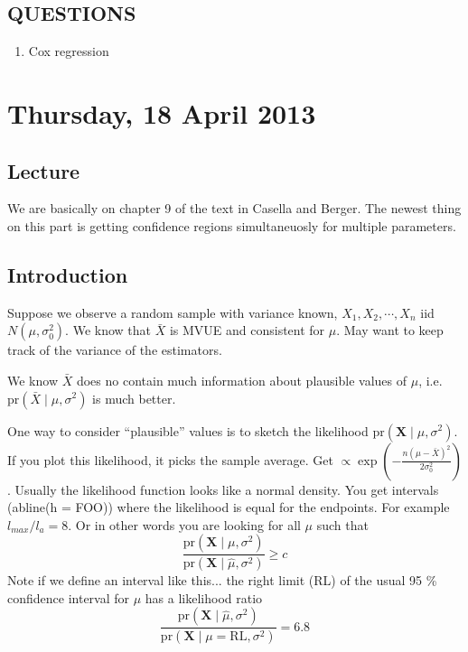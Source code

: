 \documentclass[letterpaper, 12pt]{article}
\theoremstyle{definition}
\theoremstyle{plain}
\newcommand{\pr}{\text{pr}}
\newcommand{\sbs}{\;|\;} %
\begin{document}
\subsection*{QUESTIONS}
\begin{enumerate}
\item
Cox regression
\end{enumerate}

\section{Thursday, 18 April 2013}
\subsection*{Lecture}
We are basically on chapter 9 of the text in Casella and Berger.
The newest thing on this part is getting confidence regions simultaneuosly for multiple parameters.

\subsection{Introduction}
Suppose we observe a random sample with variance known, $X_1, X_2, \cdots, X_n$ iid $N(\mu, \sigma_0^2)$. We know that $\bar{X}$ is MVUE and consistent for $\mu$. May want to keep track of the variance of the estimators.

We know $\bar{X}$ does no contain much information about plausible values of $\mu$, i.e. $\pr(\bar{X} \sbs \mu, \sigma^2)$ is much better.

One way to consider ``plausible'' values is to sketch the likelihood $\pr(\textbf{X} \sbs \mu, \sigma^2)$. If you plot this likelihood, it picks the sample average. Get $\propto \exp( - \frac{n(\mu - \bar{X})^2}{2 \sigma_0^2})$. Usually the likelihood function looks like a normal density. You get intervals (abline(h = FOO)) where the likelihood is equal for the endpoints. For example $l_{max} / l_a = 8$. Or in other words you are looking for all $\mu$ such that
\begin{equation}
\frac{\pr(\textbf{X} \sbs \mu, \sigma^2)}{\pr(\textbf{X} \sbs \hat{\mu}, \sigma^2)} \geq c
\end{equation}
Note if we define an interval like this... the right limit (RL) of the usual 95 \% confidence interval for $\mu$ has a likelihood ratio 
\begin{equation}
\frac{\pr(\textbf{X} \sbs \hat{\mu}, \sigma^2)}{\pr(\textbf{X} \sbs \mu = \text{RL}, \sigma^2)} = 6.8
\end{equation}
\end{document}
